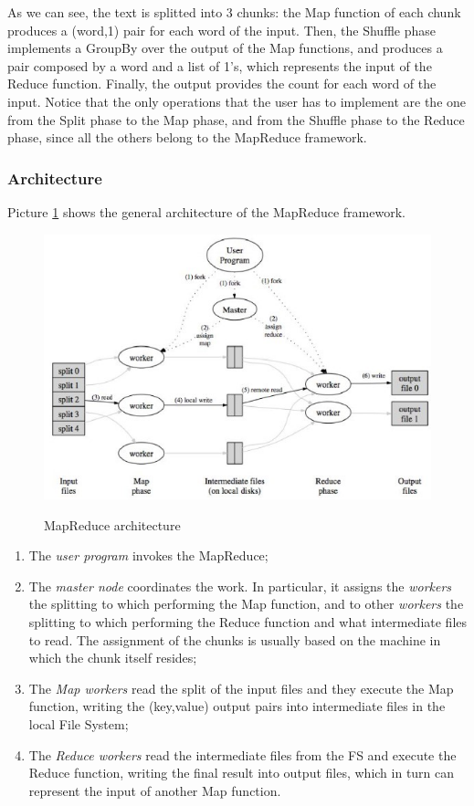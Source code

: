As we can see, the text is splitted into 3 chunks: the Map function of each chunk produces a (word,1) pair for each word of the input. Then, the Shuffle phase implements a GroupBy over the output of the Map functions, and produces a pair composed by a word and a list of 1's, which represents the input of the Reduce function. Finally, the output provides the count for each word of the input. Notice that the only operations that the user has to implement are the one from the Split phase to the Map phase, and from the Shuffle phase to the Reduce phase, since all the others belong to the MapReduce framework.

\subsubsection{Architecture}

Picture \ref{mr arch} shows the general architecture of the MapReduce framework.

\begin{figure}[h!]
		\centering
		\includegraphics[scale = 2.0]{img/map reduce arch.jpg}
        \label{mr arch}
        \caption{MapReduce architecture}
\end{figure}

\begin{enumerate}
    \item The \textit{user program} invokes the MapReduce;
    \item The \textit{master node} coordinates the work. In particular, it assigns the \textit{workers} the splitting to which performing the Map function, and to other \textit{workers} the splitting to which performing the Reduce function and what intermediate files to read. The assignment of the chunks is usually based on the machine in which the chunk itself resides;
    \item The \textit{Map workers} read the split of the input files and they execute the Map function, writing the (key,value) output pairs into intermediate files in the local File System;
    \item The \textit{Reduce workers} read the intermediate files from the FS and execute the Reduce function, writing the final result into output files, which in turn can represent the input of another Map function.
\end{enumerate}


